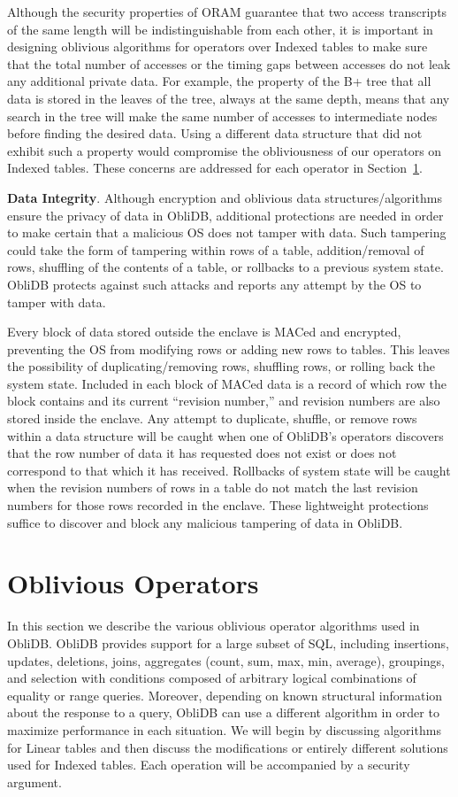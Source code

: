 \documentclass[letterpaper,twocolumn,10pt]{article}
\def\name/{ObliDB}
\begin{document}
Although the security properties of ORAM guarantee that two access transcripts of the same length will be indistinguishable from each other, it is important in designing oblivious algorithms for operators over Indexed tables to make sure that the total number of accesses or the timing gaps between accesses do not leak any additional private data. For example, the property of the B+ tree that all data is stored in the leaves of the tree, always at the same depth, means that any search in the tree will make the same number of accesses to intermediate nodes before finding the desired data. Using a different data structure that did not exhibit such a property would compromise the obliviousness of our operators on Indexed tables. These concerns are addressed for each operator in Section~\ref{oblivOps}.  

 \noindent \textbf{Data Integrity}. 
Although encryption and oblivious data structures/algorithms ensure the privacy of data in \name/, additional protections are needed in order to make certain that a malicious OS does not tamper with data. Such tampering could take the form of tampering within rows of a table, addition/removal of rows, shuffling of the contents of a table, or rollbacks to a previous system state. \name/ protects against such attacks and reports any attempt by the OS to tamper with data. 

Every block of data stored outside the enclave is MACed and encrypted, preventing the OS from modifying rows or adding new rows to tables. This leaves the possibility of duplicating/removing rows, shuffling rows, or rolling back the system state. Included in each block of MACed data is a record of which row the block contains and its current ``revision number,'' and revision numbers are also stored inside the enclave. Any attempt to duplicate, shuffle, or remove rows within a data structure will be caught when one of \name/'s operators discovers that the row number of data it has requested does not exist or does not correspond to that which it has received. Rollbacks of system state will be caught when the revision numbers of rows in a table do not match the last revision numbers for those rows recorded in the enclave. These lightweight protections suffice to discover and block any malicious tampering of data in \name/.

\section{Oblivious Operators}\label{oblivOps}
In this section we describe the various oblivious operator algorithms used in \name/. \name/ provides support for a large subset of SQL, including insertions, updates, deletions, joins, aggregates (count, sum, max, min, average), groupings, and selection with conditions composed of arbitrary logical combinations of equality or range queries. Moreover, depending on known structural information about the response to a query, \name/ can use a different algorithm in order to maximize performance in each situation. We will begin by discussing algorithms for Linear tables and then discuss the modifications or entirely different solutions used for Indexed tables. Each operation will be accompanied by a security argument. 
\end{document}
